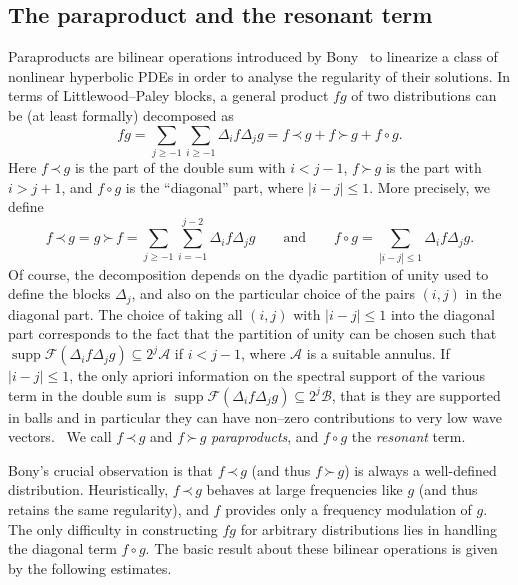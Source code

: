 \documentclass[a4paper,11pt]{article}
\newcommand{\tmop}[1]{\ensuremath{\operatorname{#1}}}
\newcommand{\tmtextit}[1]{{\itshape{#1}}}
\newcommand{\CA}{\mathscr{A}}
\newcommand{\CB}{\mathscr{B}}
\newcommand{\CF}{\mathscr{F}}
\newcommand{\lpara}{\,\mathord{\prec}\,}
\newcommand{\rpara}{\,\mathord{\succ}\,}
\newcommand{\reso}{\,\mathord{\circ}\,}
\begin{document}
\subsection{The paraproduct and the resonant term}\label{ssec:bony}

Paraproducts are bilinear operations introduced by Bony~{\cite{Bony1981}} to
linearize a class of nonlinear hyperbolic PDEs in order to analyse the
regularity of their solutions. In terms of Littlewood--Paley blocks, a general
product $fg$ of two distributions can be (at least formally) decomposed as
\[ fg = \sum_{j \geqslant - 1} \sum_{i \geqslant - 1} \Delta_i f \Delta_j g =
   f \lpara g + f \rpara g + f \reso g. \]
Here $f \lpara g$ is the part of the double sum with $i < j - 1$, $f \rpara g$
is the part with $i > j + 1$, and $f \reso g$ is the ``diagonal'' part, where
$|i - j| \leqslant 1$. More precisely, we define
\[ f \lpara g = g \rpara f = \sum_{j \geqslant - 1} \sum_{i = - 1}^{j - 2}
   \Delta_i f \Delta_j g \hspace{2em} \text{and} \hspace{2em} f \reso g =
   \sum_{|i - j| \leqslant 1} \Delta_i f \Delta_j g. \]
Of course, the decomposition depends on the dyadic partition of unity used to
define the blocks $\Delta_j$, and also on the particular choice of the pairs
$(i, j)$ in the diagonal part. The choice of taking all $(i, j)$ with $|i - j|
\leqslant 1$ into the diagonal part corresponds to the fact that the partition
of unity can be chosen such that $\tmop{supp} \CF (\Delta_i f \Delta_j g)
\subseteq 2^j \CA$ if $i < j - 1$, where $\CA$ is a suitable annulus. If $| i
- j | \leqslant 1$, the only apriori information on the spectral support of
the various term in the double sum is $\tmop{supp} \CF (\Delta_i f \Delta_j g)
\subseteq 2^j \CB$, that is they are supported in balls and in particular they
can have non--zero contributions to very low wave vectors. \ We call $f \lpara
g$ and $f \rpara g$ \tmtextit{paraproducts}, and $f \reso g$ the
\tmtextit{resonant} term.

Bony's crucial observation is that $f \lpara g$ (and thus $f \rpara g$) is
always a well-defined distribution. Heuristically, $f \lpara g$ behaves at
large frequencies like $g$ (and thus retains the same regularity), and $f$
provides only a frequency modulation of $g$. The only difficulty in
constructing $fg$ for arbitrary distributions lies in handling the diagonal
term $f \reso g$. The basic result about these bilinear operations is given by
the following estimates.
\end{document}

